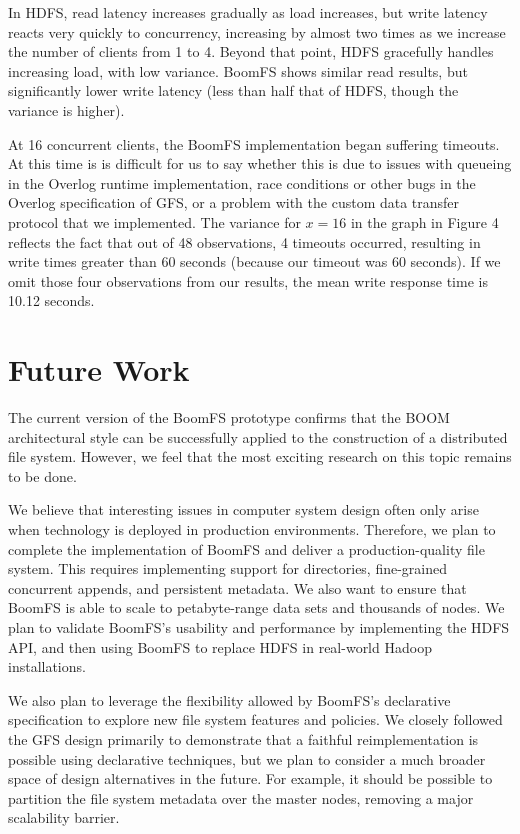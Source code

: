 \documentclass[twocolumn]{article}
\begin{document}
In HDFS, read latency increases gradually as load increases, but write
latency reacts very quickly to concurrency, increasing by almost two
times as we increase the number of clients from 1 to 4.  Beyond that
point, HDFS gracefully handles increasing load, with low variance.
BoomFS shows similar read results, but significantly lower write
latency (less than half that of HDFS, though the variance is higher).

At 16 concurrent clients, the BoomFS implementation began suffering
timeouts.  At this time is is difficult for us to say whether this is
due to issues with queueing in the Overlog runtime implementation,
race conditions or other bugs in the Overlog specification of GFS, or
a problem with the custom data transfer protocol that we implemented.
The variance for $x=16$ in the graph in Figure 4 reflects the fact
that out of 48 observations, 4 timeouts occurred, resulting in write
times greater than 60 seconds (because our timeout was 60 seconds).
If we omit those four observations from our results, the mean write
response time is 10.12 seconds.

\section{Future Work}
\label{future-work}
The current version of the BoomFS prototype confirms that the BOOM
architectural style can be successfully applied to the construction of
a distributed file system. However, we feel that the most exciting
research on this topic remains to be done.

We believe that interesting issues in computer system design often
only arise when technology is deployed in production
environments. Therefore, we plan to complete the implementation of
BoomFS and deliver a production-quality file system. This requires
implementing support for directories, fine-grained concurrent appends,
and persistent metadata. We also want to ensure that BoomFS is able to
scale to petabyte-range data sets and thousands of nodes. We plan to
validate BoomFS's usability and performance by implementing the HDFS
API, and then using BoomFS to replace HDFS in real-world Hadoop
installations.

We also plan to leverage the flexibility allowed by BoomFS's
declarative specification to explore new file system features and
policies. We closely followed the GFS design primarily to demonstrate
that a faithful reimplementation is possible using declarative
techniques, but we plan to consider a much broader space of design
alternatives in the future. For example, it should be possible to
partition the file system metadata over the master nodes, removing a
major scalability barrier.
\end{document}
